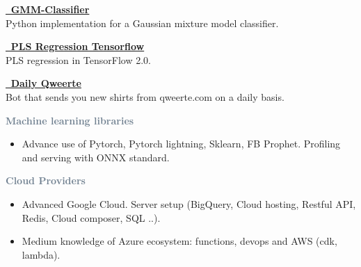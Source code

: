 \textcolor{SlateGrey}{\textbf{\href{https://github.com/jiwidi/gmm-classifier}{\faGithub \, GMM-Classifier}}} \\ 
Python implementation for a Gaussian mixture model classifier.
\newline
\vspace{1pt}

\textcolor{SlateGrey}{\textbf{\href{https://github.com/jiwidi/PLS-regression-tensorflow}{\faGithub \, PLS Regression Tensorflow}}} \\ 
PLS regression in TensorFlow 2.0.
\newline
\vspace{1pt}

\textcolor{SlateGrey}{\textbf{\href{https://github.com/jiwidi/DailyQwertee}{\faGithub \, Daily Qweerte}}} \\ 
Bot that sends you new shirts from qweerte.com on a daily basis.
\newline
\vspace{1pt}





\textcolor{SlateGrey}{\textbf{Machine learning libraries}}
\newline

\begin{itemize}
    \item Advance use of Pytorch, Pytorch lightning, Sklearn, FB Prophet. Profiling and serving with ONNX standard.
\end{itemize}

\textcolor{SlateGrey}{\textbf{Cloud Providers}}
\newline

\begin{itemize}
    \item Advanced Google Cloud. Server setup (BigQuery, Cloud hosting, Restful API, Redis, Cloud composer, SQL ..).
    \item Medium knowledge of Azure ecosystem: functions, devops and AWS (cdk, lambda).
\end{itemize}

